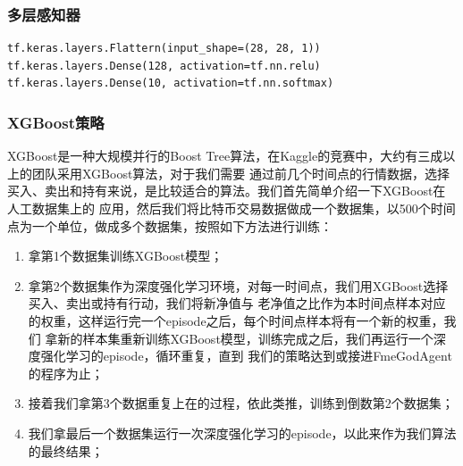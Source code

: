 \documentclass{article}
\begin{document}
\subsubsection{多层感知器}
\begin{lstlisting}
tf.keras.layers.Flattern(input_shape=(28, 28, 1))
tf.keras.layers.Dense(128, activation=tf.nn.relu)
tf.keras.layers.Dense(10, activation=tf.nn.softmax)
\end{lstlisting}



\subsubsection{XGBoost策略}
XGBoost是一种大规模并行的Boost Tree算法，在Kaggle的竞赛中，大约有三成以上的团队采用XGBoost算法，对于我们需要
通过前几个时间点的行情数据，选择买入、卖出和持有来说，是比较适合的算法。我们首先简单介绍一下XGBoost在人工数据集上的
应用，然后我们将比特币交易数据做成一个数据集，以500个时间点为一个单位，做成多个数据集，按照如下方法进行训练：
\begin{enumerate}
    \item 拿第1个数据集训练XGBoost模型；
    \item 拿第2个数据集作为深度强化学习环境，对每一时间点，我们用XGBoost选择买入、卖出或持有行动，我们将新净值与
            老净值之比作为本时间点样本对应的权重，这样运行完一个episode之后，每个时间点样本将有一个新的权重，我们
            拿新的样本集重新训练XGBoost模型，训练完成之后，我们再运行一个深度强化学习的episode，循环重复，直到
            我们的策略达到或接进FmeGodAgent的程序为止；
    \item 接着我们拿第3个数据重复上在的过程，依此类推，训练到倒数第2个数据集；
    \item 我们拿最后一个数据集运行一次深度强化学习的episode，以此来作为我们算法的最终结果；
\end{enumerate}
\end{document}
